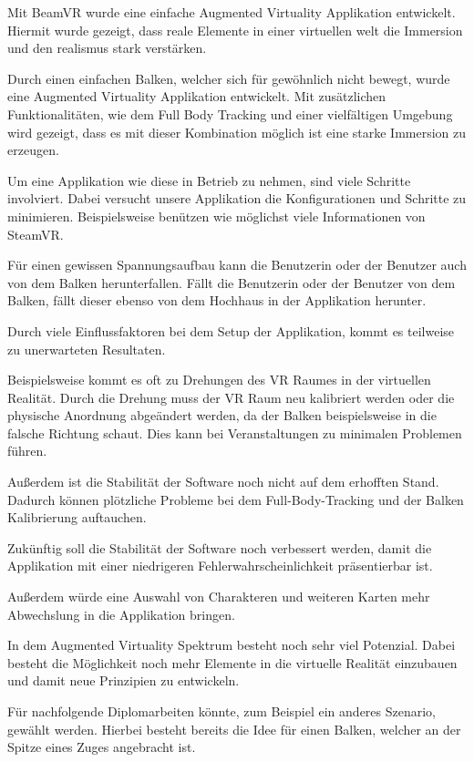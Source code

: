 Mit BeamVR wurde eine einfache Augmented Virtuality Applikation entwickelt.
Hiermit wurde gezeigt, dass reale Elemente in einer virtuellen welt die Immersion und den realismus stark verstärken.

Durch einen einfachen Balken, welcher sich für gewöhnlich nicht bewegt, wurde eine Augmented Virtuality Applikation entwickelt.
Mit zusätzlichen Funktionalitäten, wie dem Full Body Tracking und einer vielfältigen Umgebung wird gezeigt, dass es mit dieser Kombination möglich ist eine starke Immersion zu erzeugen.

Um eine Applikation wie diese in Betrieb zu nehmen, sind viele Schritte involviert.
Dabei versucht unsere Applikation die Konfigurationen und Schritte zu minimieren.
Beispielsweise benützen wie möglichst viele Informationen von SteamVR.

Für einen gewissen Spannungsaufbau kann die Benutzerin oder der Benutzer auch von dem Balken herunterfallen.
Fällt die Benutzerin oder der Benutzer von dem Balken, fällt dieser ebenso von dem Hochhaus in der Applikation herunter.

Durch viele Einflussfaktoren bei dem Setup der Applikation, kommt es teilweise zu unerwarteten Resultaten.

Beispielsweise kommt es oft zu Drehungen des VR Raumes in der virtuellen Realität.
Durch die Drehung muss der VR Raum neu kalibriert werden oder die physische Anordnung abgeändert werden, da der Balken beispielsweise in die falsche Richtung schaut.
Dies kann bei Veranstaltungen zu minimalen Problemen führen.

Außerdem ist die Stabilität der Software noch nicht auf dem erhofften Stand.
Dadurch können plötzliche Probleme bei dem Full-Body-Tracking und der Balken Kalibrierung auftauchen.

Zukünftig soll die Stabilität der Software noch verbessert werden, damit die Applikation mit einer niedrigeren Fehlerwahrscheinlichkeit präsentierbar ist.

Außerdem würde eine Auswahl von Charakteren und weiteren Karten mehr Abwechslung in die Applikation bringen.

In dem Augmented Virtuality Spektrum besteht noch sehr viel Potenzial.
Dabei besteht die Möglichkeit noch mehr Elemente in die virtuelle Realität einzubauen und damit neue Prinzipien zu entwickeln.

Für nachfolgende Diplomarbeiten könnte, zum Beispiel ein anderes Szenario, gewählt werden.
Hierbei besteht bereits die Idee für einen Balken, welcher an der Spitze eines Zuges angebracht ist.
